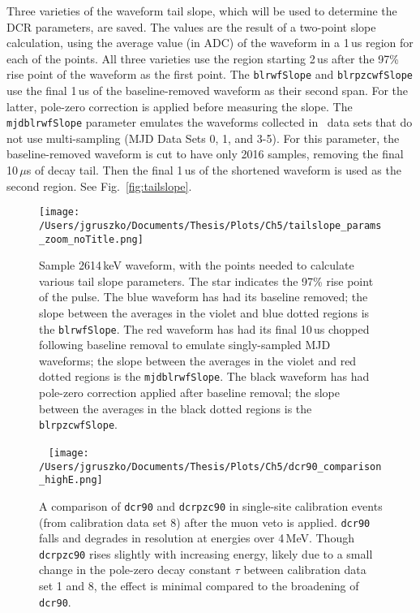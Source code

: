Three varieties of the waveform tail slope, which will be used to determine the DCR parameters, are saved. The values are the result of a two-point slope calculation, using the average value (in ADC) of the waveform in a 1\,us region for each of the points. All three varieties use the region starting 2\,us after the 97\% rise point of the waveform as the first point. The {\tt blrwfSlope} and {\tt blrpzcwfSlope} use the final 1\,us of the baseline-removed waveform as their second span. For the latter, pole-zero correction is applied before measuring the slope. The {\tt mjdblrwfSlope} parameter emulates the waveforms collected in \MJ\ data sets that do not use multi-sampling (MJD Data Sets 0, 1, and 3-5). For this parameter, the baseline-removed waveform is cut to have only 2016 samples, removing the final 10\,$\mu$s of decay tail. Then the final 1\,us of the shortened waveform is used as the second region. See Fig.~\ref{fig:tailslope}.


\begin{figure*}[]
 \centering
 \centering
 \texttt{[image: /Users/jgruszko/Documents/Thesis/Plots/Ch5/tailslope\_params\_zoom\_noTitle.png]}
 \caption[A sample TUBE waveform, with indicated tail slope measurement points]{Sample 2614\,keV waveform, with the points needed to calculate various tail slope parameters. The star indicates the 97\% rise point of the pulse. The blue waveform has had its baseline removed; the slope between the averages in the violet and blue dotted regions is the {\tt blrwfSlope}. The red waveform has had its final 10\,us chopped following baseline removal to emulate singly-sampled MJD waveforms; the slope between the averages in the violet and red dotted regions is the {\tt mjdblrwfSlope}. The black waveform has had pole-zero correction applied after baseline removal; the slope between the averages in the black dotted regions is the {\tt blrpzcwfSlope}.} 
 \label{fig:tailslope}
~
  \centering
 \texttt{[image: /Users/jgruszko/Documents/Thesis/Plots/Ch5/dcr90\_comparison\_highE.png]}
 \caption[A comparison of v1.0 ({\tt dcr90}) and v2.0 ({\tt dcrpzc90}) of the DCR analysis in the TUBE system]{A comparison of {\tt dcr90} and {\tt dcrpzc90} in single-site calibration events (from calibration data set 8) after the muon veto is applied. {\tt dcr90} falls and degrades in resolution at energies over 4\,MeV. Though {\tt dcrpzc90} rises slightly with increasing energy, likely due to a small change in the pole-zero decay constant $\tau$ between calibration data set 1 and 8, the effect is minimal compared to the broadening of {\tt dcr90}.} 
 \label{fig:dcr_dcrpzc_comparison}
\end{figure*}

